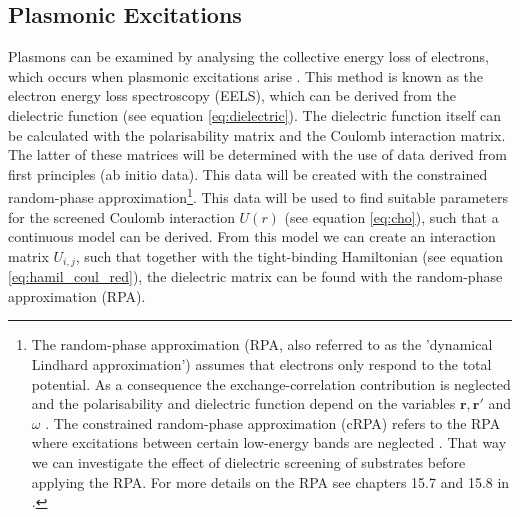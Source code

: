 
\subsection{Plasmonic Excitations}\label{plasmonic_excitations}

Plasmons can be examined by analysing the collective energy loss of electrons, which occurs when plasmonic excitations arise \cite{Bao2017}. This method is known as the electron energy loss spectroscopy (EELS), which can be derived from the dielectric function (see equation \ref{eq:dielectric}). The dielectric function itself can be calculated with the polarisability matrix and the Coulomb interaction matrix. The latter of these matrices will be determined with the use of data derived from first principles (ab initio data). This data will be created with the constrained random-phase approximation\footnote{The random-phase approximation (RPA, also referred to as the 'dynamical Lindhard approximation') assumes that electrons only respond to the total potential. As a consequence the exchange-correlation contribution is neglected and the polarisability and dielectric function depend on the variables $\mathbf{r},\mathbf{r}'$ and $\omega$ \cite{Girvin2019}. The constrained random-phase approximation (cRPA) refers to the RPA where
excitations between certain low-energy bands are neglected \cite{Vanhala2020}. That way we can investigate the effect of dielectric screening of substrates before applying the RPA. For more details on the RPA see chapters 15.7 and 15.8 in \textcite{Girvin2019}.}. This data will be used to find suitable parameters for the screened Coulomb interaction $U(r)$ (see equation \ref{eq:cho}), such that a continuous model can be derived. From this model we can create an interaction matrix $U_{i,j}$, such that together with the tight-binding Hamiltonian (see equation \ref{eq:hamil_coul_red}), the dielectric matrix can be found with the random-phase approximation (RPA). 

